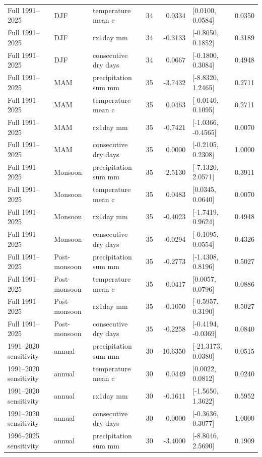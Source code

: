 \begin{longtable}{p{}p{}p{}r r p{}r}
Full 1991--2025 & DJF & temperature mean c & 34 & 0.0334 & [0.0100, 0.0584] & 0.0350 \\
Full 1991--2025 & DJF & rx1day mm & 34 & -0.3133 & [-0.8050, 0.1852] & 0.3189 \\
Full 1991--2025 & DJF & consecutive dry days & 34 & 0.0667 & [-0.1800, 0.3084] & 0.4948 \\
Full 1991--2025 & MAM & precipitation sum mm & 35 & -3.7432 & [-8.8320, 1.2465] & 0.2711 \\
Full 1991--2025 & MAM & temperature mean c & 35 & 0.0463 & [-0.0140, 0.1095] & 0.2711 \\
Full 1991--2025 & MAM & rx1day mm & 35 & -0.7421 & [-1.0366, -0.4565] & 0.0070 \\
Full 1991--2025 & MAM & consecutive dry days & 35 & 0.0000 & [-0.2105, 0.2308] & 1.0000 \\
Full 1991--2025 & Monsoon & precipitation sum mm & 35 & -2.5130 & [-7.1320, 2.0571] & 0.3911 \\
Full 1991--2025 & Monsoon & temperature mean c & 35 & 0.0483 & [0.0345, 0.0640] & 0.0070 \\
Full 1991--2025 & Monsoon & rx1day mm & 35 & -0.4023 & [-1.7419, 0.9624] & 0.4948 \\
Full 1991--2025 & Monsoon & consecutive dry days & 35 & -0.0294 & [-0.1095, 0.0554] & 0.4326 \\
Full 1991--2025 & Post-monsoon & precipitation sum mm & 35 & -0.2773 & [-1.4308, 0.8196] & 0.5027 \\
Full 1991--2025 & Post-monsoon & temperature mean c & 35 & 0.0417 & [0.0057, 0.0796] & 0.0886 \\
Full 1991--2025 & Post-monsoon & rx1day mm & 35 & -0.1050 & [-0.5957, 0.3190] & 0.5027 \\
Full 1991--2025 & Post-monsoon & consecutive dry days & 35 & -0.2258 & [-0.4194, -0.0369] & 0.0840 \\
1991--2020 sensitivity & annual & precipitation sum mm & 30 & -10.6350 & [-21.3173, 0.0380] & 0.0515 \\
1991--2020 sensitivity & annual & temperature mean c & 30 & 0.0449 & [0.0022, 0.0812] & 0.0240 \\
1991--2020 sensitivity & annual & rx1day mm & 30 & -0.1611 & [-1.5650, 1.3622] & 0.5952 \\
1991--2020 sensitivity & annual & consecutive dry days & 30 & 0.0000 & [-0.3636, 0.3077] & 1.0000 \\
1996--2025 sensitivity & annual & precipitation sum mm & 30 & -3.4000 & [-8.8046, 2.5690] & 0.1909 \\

\end{longtable}
